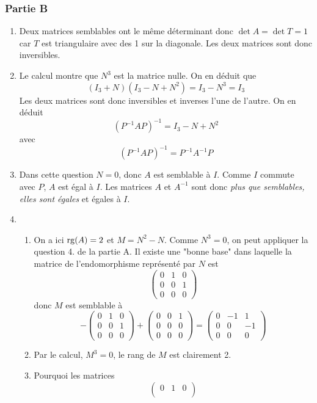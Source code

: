 \subsubsection*{Partie B}
\begin{enumerate}
 \item Deux matrices semblables ont le même déterminant donc $\det A = \det T = 1$ car $T$ est triangulaire avec des 1 sur la diagonale. Les deux matrices sont donc inversibles.
\item Le calcul montre que $N^3$ est la matrice nulle. On en déduit que 
\[(I_3+N)(I_3-N+N^2)=I_3-N^3=I_3\]
Les deux matrices sont donc inversibles et inverses l'une de l'autre. On en déduit
\[(P^{-1}AP)^{-1}=I_3-N+N^2\]
avec
\[(P^{-1}AP)^{-1}=P^{-1}A^{-1}P\]
\item Dans cette question $N=0$, donc $A$ est semblable à $I$. Comme $I$ commute avec $P$, $A$ est égal à $I$. Les matrices $A$ et $A^{-1}$ sont donc \emph{plus que semblables, elles sont égales} et égales à $I$.
\item \begin{enumerate}
 \item On a ici $\operatorname{rg}(A)=2$ et $M=N^{2}-N$. Comme $N^3=0$, on peut appliquer la question 4. de la partie A. Il existe une "bonne base" dans laquelle la matrice de l'endomorphisme représenté par $N$ est
\[
 \begin{pmatrix}
0 & 1 & 0 \\
0 & 0 & 1 \\
0 & 0 & 0
  \end{pmatrix}
\]
donc $M$ est semblable à
\[
- \begin{pmatrix}
0 & 1 & 0 \\
0 & 0 & 1 \\
0 & 0 & 0
  \end{pmatrix}
+
 \begin{pmatrix}
0 & 0 & 1 \\
0 & 0 & 0 \\
0 & 0 & 0
  \end{pmatrix}
=
 \begin{pmatrix}
0 & -1 & 1 \\
0 & 0 & -1 \\
0 & 0 & 0
  \end{pmatrix}
 \] 
\item Par le calcul, $M^{3}=0$, le rang de $M$ est clairement 2.
\item Pourquoi les matrices
\[
 \begin{pmatrix}
0 & 1 & 0 \\

\end{pmatrix}\]
\end{enumerate}
\end{enumerate}
